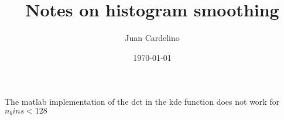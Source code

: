 \documentclass[11pt]{report}
\title{Notes on histogram smoothing}
\author{Juan Cardelino}
\date{\today}
\begin{document}
\maketitle
The matlab implementation of the dct in the kde function does not work for $n_bins<128$



\cleardoublepage

 

%
%
\end{document}
